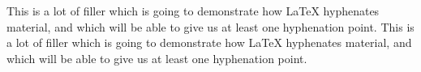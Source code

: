 \documentclass{article}
\begin{document}
This is a lot of filler which is going to demonstrate how LaTeX hyphenates
material, and which will be able to give us at least one hyphenation point.
This is a lot of filler which is going to demonstrate how LaTeX hyphenates
material, and which will be able to give us at least one hyphenation point.
\end{document}
